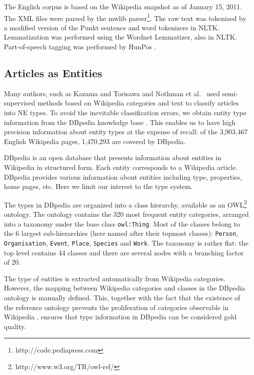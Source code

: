 \documentclass[11pt]{article}
\begin{document}
The English corpus is based on the Wikipedia snapshot as of January 15, 2011. The XML files were parsed by the mwlib parser\footnote{http://code.pediapress.com}. The raw text was tokenized by a modified version of the Punkt sentence and word tokenizers \cite{Kiss:06} in NLTK. 
Lemmatization was performed using the Wordnet Lemmatizer, also in NLTK. Part-of-speech tagging was performed by HunPos \cite{Halacsy:07}.


\subsection{Articles as Entities}
\label{dbpedia}

Many authors, such as Kazama and Torisawa  and Nothman et al.~ used semi-supervised methods based on Wikipedia categories and text to classify articles into NE types. To avoid the inevitable classification errors, we obtain entity type information from the DBpedia knowledge base \cite{Bizer:09}. This enables us to have high precision information about entity types at the expense of recall: of the 3,903,467 English Wikipedia pages, 1,470,293 are covered by DBpedia.

DBpedia is an open database that presents information about entities in Wikipedia in structured form. Each entity corresponds to a Wikipedia article. DBpedia provides various information about entities including type, properties, home pages, etc. Here we limit our interest to the type system.

The types in DBpedia are organized into a class hierarchy, available as an OWL\footnote{http://www.w3.org/TR/owl-ref/} ontology. The ontology contains the 320 most frequent entity categories, arranged into a taxonomy under the base class \texttt{owl:Thing}. Most of the classes belong to the 6 largest sub-hierarchies (here named after their topmost classes): \texttt{Person}, \texttt{Organisation}, \texttt{Event}, \texttt{Place}, \texttt{Species} and \texttt{Work}. The taxonomy is rather flat: the top level contains 44 classes and there are several nodes with a branching factor of 20.

The type of entities is extracted automatically from Wikipedia categories. However, the mapping between Wikipedia categories and classes in the DBpedia ontology is manually defined. This, together with the fact that the existence of the reference ontology prevents the proliferation of categories observable in Wikipedia \cite{Bizer:09}, ensures that type information in DBpedia can be considered gold quality.
\end{document}
